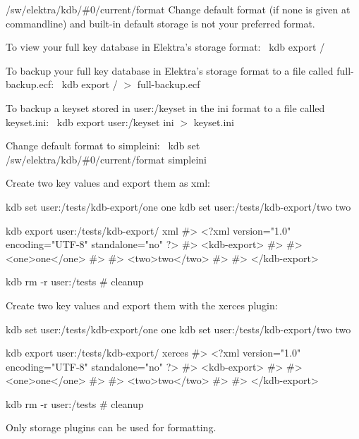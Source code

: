 \begin{DoxyItemize}
\item {\ttfamily /sw/elektra/kdb/\#0/current/format} Change default format (if none is given at commandline) and built-\/in default {\ttfamily storage} is not your preferred format.
\end{DoxyItemize}

To view your full key database in Elektra’s {\ttfamily storage} format\+:~\newline
 {\ttfamily kdb export /}~\newline


To backup your full key database in Elektra’s {\ttfamily storage} format to a file called {\ttfamily full-\/backup.\+ecf}\+:~\newline
 {\ttfamily kdb export / $>$ full-\/backup.\+ecf}~\newline


To backup a keyset stored in {\ttfamily user\+:/keyset} in the {\ttfamily ini} format to a file called {\ttfamily keyset.\+ini}\+:~\newline
 {\ttfamily kdb export user\+:/keyset ini $>$ keyset.\+ini}~\newline


Change default format to {\ttfamily simpleini}\+:~\newline
 {\ttfamily kdb set /sw/elektra/kdb/\#0/current/format simpleini}

Create two key values and export them as {\ttfamily xml}\+:


\begin{DoxyCode}
kdb set user:/tests/kdb-export/one one
kdb set user:/tests/kdb-export/two two

kdb export user:/tests/kdb-export/ xml
#> <?xml version="1.0" encoding="UTF-8" standalone="no" ?>
#> <kdb-export>
#>
#>   <one>one</one>
#>
#>   <two>two</two>
#>
#> </kdb-export>


kdb rm -r user:/tests
# cleanup
\end{DoxyCode}


Create two key values and export them with the {\ttfamily xerces} plugin\+:


\begin{DoxyCode}
kdb set user:/tests/kdb-export/one one
kdb set user:/tests/kdb-export/two two

kdb export user:/tests/kdb-export/ xerces
#> <?xml version="1.0" encoding="UTF-8" standalone="no" ?>
#> <kdb-export>
#>
#>   <one>one</one>
#>
#>   <two>two</two>
#>
#> </kdb-export>

kdb rm -r user:/tests
# cleanup
\end{DoxyCode}



\begin{DoxyItemize}
\item Only storage plugins can be used for formatting. 
\end{DoxyItemize}